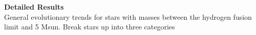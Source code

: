 \textbf{Detailed Results} \\
General evolutionary trends for stars with masses between the hydrogen fusion limit and 5 Msun. Break stars up into three categories 